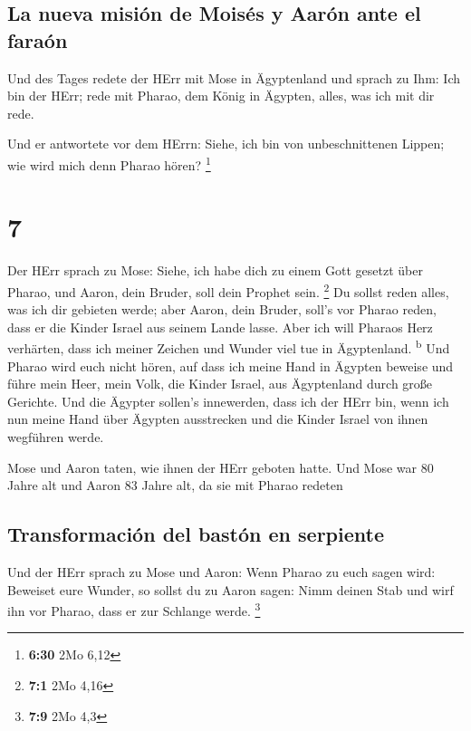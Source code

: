 \hypertarget{la-nueva-misiuxf3n-de-moisuxe9s-y-aaruxf3n-ante-el-farauxf3n}{%
\subsection{La nueva misión de Moisés y Aarón ante el
faraón}\label{la-nueva-misiuxf3n-de-moisuxe9s-y-aaruxf3n-ante-el-farauxf3n}}

 Und des Tages redete der HErr mit Mose in Ägyptenland
 und sprach zu Ihm: Ich bin der HErr; rede mit Pharao,
dem König in Ägypten, alles, was ich mit dir rede.

 Und er antwortete vor dem HErrn: Siehe, ich bin von
unbeschnittenen Lippen; wie wird mich denn Pharao hören? \footnote{\textbf{6:30}
  2Mo 6,12}

\hypertarget{section-6}{%
\section{7}\label{section-6}}

 Der HErr sprach zu Mose: Siehe, ich habe dich zu einem
Gott gesetzt über Pharao, und Aaron, dein Bruder, soll dein Prophet
sein. \footnote{\textbf{7:1} 2Mo 4,16}  Du sollst reden
alles, was ich dir gebieten werde; aber Aaron, dein Bruder, soll's vor
Pharao reden, dass er die Kinder Israel aus seinem Lande lasse.
 Aber ich will Pharaos Herz verhärten, dass ich meiner
Zeichen und Wunder viel tue in Ägyptenland. \textsuperscript{b}
 Und Pharao wird euch nicht hören, auf dass ich meine Hand
in Ägypten beweise und führe mein Heer, mein Volk, die Kinder Israel,
aus Ägyptenland durch große Gerichte.  Und die Ägypter
sollen's innewerden, dass ich der HErr bin, wenn ich nun meine Hand über
Ägypten ausstrecken und die Kinder Israel von ihnen wegführen werde.

 Mose und Aaron taten, wie ihnen der HErr geboten hatte.
 Und Mose war 80 Jahre alt und Aaron 83 Jahre alt, da sie
mit Pharao redeten

\hypertarget{transformaciuxf3n-del-bastuxf3n-en-serpiente}{%
\subsection{Transformación del bastón en
serpiente}\label{transformaciuxf3n-del-bastuxf3n-en-serpiente}}

 Und der HErr sprach zu Mose und Aaron: 
Wenn Pharao zu euch sagen wird: Beweiset eure Wunder, so sollst du zu
Aaron sagen: Nimm deinen Stab und wirf ihn vor Pharao, dass er zur
Schlange werde. \footnote{\textbf{7:9} 2Mo 4,3}

